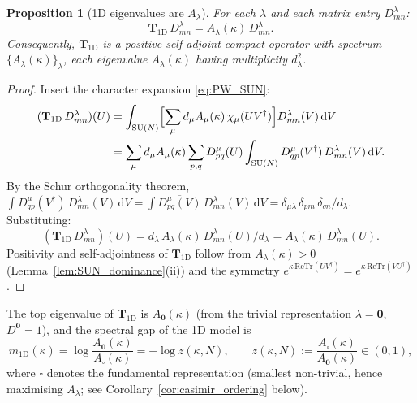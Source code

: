 \documentclass[11pt,a4paper]{amsart}
\newtheorem{proposition}[theorem]{Proposition}
\theoremstyle{definition}
\newcommand{\SU}{\mathrm{SU}}
\newcommand{\re}{\mathrm{Re}}
\newcommand{\Tr}{\mathrm{Tr}}
\begin{document}
\begin{proposition}[1D eigenvalues are $A_\lambda$]
\label{prop:1D_eigs}
For each $\lambda$ and each matrix entry $D^\lambda_{mn}$:
\begin{equation}
\label{eq:T1D_eig}
  \mathbf{T}_{\mathrm{1D}}\,D^\lambda_{mn} = A_\lambda(\kappa)\,D^\lambda_{mn}.
\end{equation}
Consequently, $\mathbf{T}_{\mathrm{1D}}$ is a positive self-adjoint compact operator
with spectrum $\{A_\lambda(\kappa)\}_\lambda$, each eigenvalue $A_\lambda(\kappa)$
having multiplicity $d_\lambda^2$.
\end{proposition}
\begin{proof}
Insert the character expansion \eqref{eq:PW_SUN}:
\begin{align*}
  (\mathbf{T}_{\mathrm{1D}}\,D^\lambda_{mn})(U)
  &= \int_{\SU(N)} \Bigl[\sum_\mu d_\mu A_\mu(\kappa)\,\chi_\mu(UV^\dagger)\Bigr]
     D^\lambda_{mn}(V)\,\mathrm{d}V \\
  &= \sum_\mu d_\mu A_\mu(\kappa)\sum_{p,q}
     D^\mu_{pq}(U)
     \int_{\SU(N)} D^\mu_{qp}(V^\dagger)\,D^\lambda_{mn}(V)\,\mathrm{d}V.
\end{align*}
By the Schur orthogonality theorem,
$\int D^\mu_{qp}(V^\dagger)\,D^\lambda_{mn}(V)\,\mathrm{d}V
= \int \overline{D^\mu_{pq}(V)}\,D^\lambda_{mn}(V)\,\mathrm{d}V
= \delta_{\mu\lambda}\,\delta_{pm}\,\delta_{qn}/d_\lambda$.
Substituting:
\[
  (\mathbf{T}_{\mathrm{1D}}\,D^\lambda_{mn})(U)
  = d_\lambda\,A_\lambda(\kappa)\,D^\lambda_{mn}(U)/d_\lambda
  = A_\lambda(\kappa)\,D^\lambda_{mn}(U).
\]
Positivity and self-adjointness of $\mathbf{T}_{\mathrm{1D}}$ follow from
$A_\lambda(\kappa) > 0$ (Lemma~\ref{lem:SUN_dominance}(ii)) and the
symmetry $e^{\kappa\,\re\Tr(UV^\dagger)} = e^{\kappa\,\re\Tr(VU^\dagger)}$.
\end{proof}

The top eigenvalue of $\mathbf{T}_{\mathrm{1D}}$ is $A_\mathbf{0}(\kappa)$
(from the trivial representation $\lambda = \mathbf{0}$, $D^\mathbf{0} = 1$),
and the spectral gap of the 1D model is
\begin{equation}
\label{eq:gap_1D}
  m_{\mathrm{1D}}(\kappa) = \log\!\frac{A_\mathbf{0}(\kappa)}{A_\square(\kappa)}
  = -\log z(\kappa, N),
  \qquad z(\kappa,N) := \frac{A_\square(\kappa)}{A_\mathbf{0}(\kappa)} \in (0,1),
\end{equation}
where $\square$ denotes the fundamental representation (smallest non-trivial,
hence maximising $A_\lambda$; see Corollary~\ref{cor:casimir_ordering} below).
\end{document}
